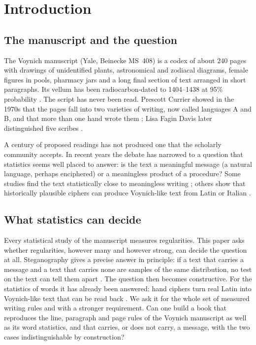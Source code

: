 \section{Introduction}

\subsection{The manuscript and the question}

The Voynich manuscript (Yale, Beinecke MS~408) is a codex of about 240 pages with drawings of unidentified plants,
astronomical and zodiacal diagrams, female figures in pools, pharmacy jars and a long final section of text arranged in
short paragraphs. Its vellum has been radiocarbon-dated to 1404--1438 at 95\% probability
\citep{uarizona2011,zyats2016}. The script has never been read. Prescott Currier showed in the 1970s that the pages fall
into two varieties of writing, now called languages A and B, and that more than one hand wrote them
\citep{currier1976}; Lisa Fagin Davis later distinguished five scribes \citep{davis2020}.

A century of proposed readings has not produced one that the scholarly community accepts. In recent years the debate
has narrowed to a question that statistics seems well placed to answer: is the text a meaningful message (a natural
language, perhaps enciphered) or a meaningless product of a procedure? Some studies find the text statistically close
to meaningless writing \citep{rugg2004,schinner2007,timmschinner2020,gaskellbowern2022}; others show that historically
plausible ciphers can produce Voynich-like text from Latin or Italian \citep{bowerngaskell2022,greshko2025,kinnison2026}.

\subsection{What statistics can decide}

Every statistical study of the manuscript measures regularities. This paper asks whether regularities, however many and
however strong, can decide the question at all. Steganography gives a precise answer in principle: if a text that
carries a message and a text that carries none are samples of the same distribution, no test on the text can tell them
apart \citep{cachin1998,hopper2002}. The question then becomes constructive. For the statistics of words it has already been answered: hand ciphers turn
real Latin into Voynich-like text that can be read back \citep{greshko2025}. We ask it for the whole set of measured
writing rules and with a stronger requirement. Can one build a book that reproduces the line, paragraph and page rules
of the Voynich manuscript as well as its word statistics, and that carries, or does not carry, a message, with the two
cases indistinguishable by construction?

